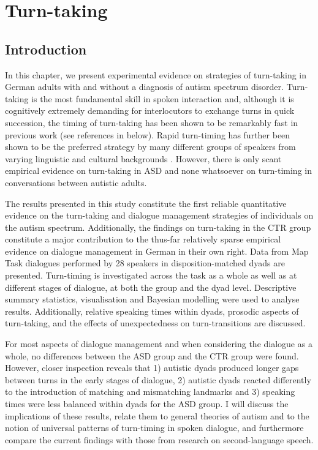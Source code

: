 \chapter{Turn-taking} \label{turntaking}

\section{Introduction}\label{sec:turntaking_introduction}

In this chapter, we present experimental evidence on strategies of turn-taking in German adults with and without a diagnosis of autism spectrum disorder. Turn-taking is the most fundamental skill in spoken interaction and, although it is cognitively extremely demanding for interlocutors to exchange turns in quick succession, the timing of turn-taking has been shown to be remarkably fast in previous work (see references in  below). Rapid turn-timing has further been shown to be the preferred strategy by many different groups of speakers from varying linguistic and cultural backgrounds \citep[e.g.][]{stiversUniversalsCulturalVariation2009}. However, there is only scant empirical evidence on turn-taking in ASD and none whatsoever on turn-timing in conversations between autistic adults.

The results presented in this study constitute the first reliable quantitative evidence on the turn-taking and dialogue management strategies of individuals on the autism spectrum. Additionally, the findings on turn-taking in the CTR group constitute a major contribution to the thus-far relatively sparse empirical evidence on dialogue management in German in their own right. Data from Map Task dialogues performed by 28 speakers in disposition-matched dyads are presented. Turn-timing is investigated across the task as a whole as well as at different stages of dialogue, at both the group and the dyad level. Descriptive summary statistics, visualisation and Bayesian modelling were used to analyse results. Additionally, relative speaking times within dyads, prosodic aspects of turn-taking, and the effects of unexpectedness on turn-transitions are discussed.

For most aspects of dialogue management and when considering the dialogue as a whole, no differences between the ASD group and the CTR group were found. However, closer inspection reveals that 1) autistic dyads produced longer gaps between turns in the early stages of dialogue, 2) autistic dyads reacted differently to the introduction of matching and mismatching landmarks and 3) speaking times were less balanced within dyads for the ASD group. I will discuss the implications of these results, relate them to general theories of autism and to the notion of universal patterns of turn-timing in spoken dialogue, and furthermore compare the current findings with those from research on second-language speech.

